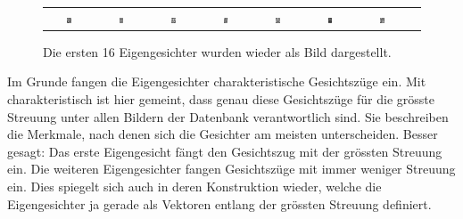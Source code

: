 \begin{figure}[ht]
\begin{tabular}{cccccccc}
		\includegraphics[width=0.1\textwidth]{images/eigenfaces/eigenface09} & \includegraphics[width=0.1\textwidth]{images/eigenfaces/eigenface10} &
		\includegraphics[width=0.1\textwidth]{images/eigenfaces/eigenface11} & \includegraphics[width=0.1\textwidth]{images/eigenfaces/eigenface12} &
		\includegraphics[width=0.1\textwidth]{images/eigenfaces/eigenface13} & \includegraphics[width=0.1\textwidth]{images/eigenfaces/eigenface14} &
		\includegraphics[width=0.1\textwidth]{images/eigenfaces/eigenface15} \\
	\end{tabular}
	\caption{Die ersten 16 Eigengesichter wurden wieder als Bild dargestellt.}
	\label{fig:eigenfaces}
\end{figure}

Im Grunde fangen die Eigengesichter charakteristische Gesichtszüge ein.
Mit charakteristisch ist hier gemeint, dass genau diese Gesichtszüge für die grösste Streuung unter allen Bildern der Datenbank verantwortlich sind.
Sie beschreiben die Merkmale, nach denen sich die Gesichter am meisten unterscheiden.
Besser gesagt: Das erste Eigengesicht fängt den Gesichtszug mit der grössten Streuung ein.
Die weiteren Eigengesichter fangen Gesichtszüge mit immer weniger Streuung ein.
Dies spiegelt sich auch in deren Konstruktion wieder, welche die Eigengesichter ja gerade als Vektoren entlang der grössten Streuung definiert.